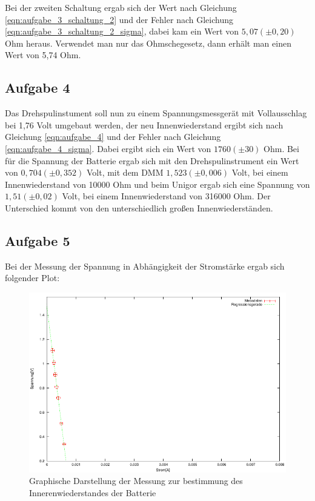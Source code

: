 \documentclass[12pt]{scrartcl}
\begin{document}
Bei der zweiten Schaltung ergab sich der Wert nach Gleichung \ref{eqn:aufgabe_3_schaltung_2} und der Fehler nach Gleichung \ref{eqn:aufgabe_3_schaltung_2_sigma}, dabei kam ein Wert von $5,07 (\pm 0,20)$ Ohm heraus.
Verwendet man nur das Ohmschegesetz, dann erhält man einen Wert von 5,74 Ohm.

\subsection{Aufgabe 4}
Das Drehspulinstument soll nun zu einem Spannungsmessgerät mit Vollausschlag bei 1,76 Volt umgebaut werden, der neu Innenwiederstand ergibt sich nach Gleichung \ref{eqn:aufgabe_4} und der Fehler nach Gleichung \ref{eqn:aufgabe_4_sigma}.
Dabei ergibt sich ein Wert von $1760 (\pm 30)$ Ohm.
Bei für die Spannung der Batterie ergab sich mit den Drehspulinstrument ein Wert von $0,704 (\pm 0,352)$ Volt, mit dem DMM $1,523 (\pm 0,006)$ Volt, bei einem Innenwiederstand von 10000 Ohm und beim Unigor ergab sich eine Spannung von $1,51 (\pm 0,02)$ Volt, bei einem Innenwiederstand von 316000 Ohm.
Der Unterschied kommt von den unterschiedlich großen Innenwiederständen.

\subsection{Aufgabe 5}
Bei der Messung der Spannung in Abhängigkeit der Stromstärke ergab sich folgender Plot:

\begin{figure}[htbp] 
	 \centering
	   \includegraphics[scale = 1]{Wiederstand.pdf}
	 	\caption[Graphische Darstellung der Messung zur bestimmung des Innerenwiederstandes der Batterie]{Graphische Darstellung der Messung zur bestimmung des Innerenwiederstandes der Batterie}
	 \label{fig:aufgabe_5_plot}
\end{figure}
\end{document}
